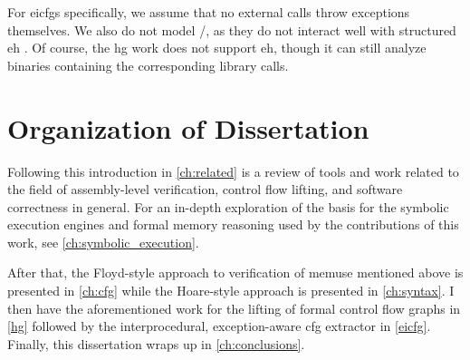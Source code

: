 For \acp{eicfg} specifically, we assume that no external calls throw exceptions themselves.
We also do not model /, as they do not interact well with structured \ac{eh} \autocite{using-setjmp-and-longjmp}.
Of course, the \ac{hg} work does not support \ac{eh}, though it can still analyze binaries containing the corresponding library calls.


\section{Organization of Dissertation}
Following this introduction in \cref{ch:related} is a review of tools and work related to the field of assembly-level verification, control flow lifting, and software correctness in general.
For an in-depth exploration of the basis for the symbolic execution engines and formal memory reasoning used by the contributions of this work,
see \cref{ch:symbolic_execution}.

After that, the Floyd-style approach to verification of \gls{memuse} mentioned above is presented in \cref{ch:cfg} while the Hoare-style approach is presented in \cref{ch:syntax}.
I then have the aforementioned work for the lifting of formal control flow graphs in \cref{hg}
followed by the interprocedural, exception-aware \ac{cfg} extractor in \cref{eicfg}.
Finally, this dissertation wraps up in \cref{ch:conclusions}.
